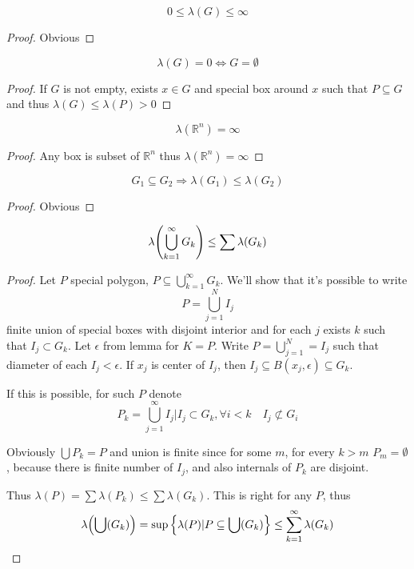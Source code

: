 \begin{prop}
	$$0 \leq \lambda(G) \leq \infty$$
	\begin{proof}
		Obvious
	\end{proof}
\end{prop}
\begin{prop}
	$$\lambda(G) = 0 \iff G =\emptyset$$
\begin{proof}
	If $G$ is not empty, exists $x\in G$ and special box around $x$ such that $P\subseteq G$and thus $\lambda(G) \leq \lambda(P) > 0$
\end{proof}
\end{prop}
\begin{prop}
	$$\lambda(\mathbb{R}^n) = \infty$$
	\begin{proof}
		Any box is subset of $\mathbb{R}^n$ thus $\lambda(\mathbb{R}^n) = \infty$
	\end{proof}
\end{prop}
\begin{prop}
	$$G_1 \subseteq G_2 \Rightarrow \lambda(G_1) \leq \lambda(G_2)$$
	\begin{proof}
		Obvious
	\end{proof}
\end{prop}
\begin{prop}
	$$\lambda\qty(\bigcup_{k=1}^\infty G_k) \leq \sum \lambda(G_k)$$
	\begin{proof}
		Let $P$ special polygon, $P\subseteq \bigcup_{k=1}^\infty G_k$. We'll show that it's possible to write 
		$$P = \bigcup_{j=1}^N I_j$$
		finite union of special boxes with disjoint interior and for each $j$ exists $k$ such that $I_j \subset G_k$. Let $\epsilon$ from lemma for $K=P$. Write $P=\bigcup_{j=1}^N = I_j$ such that diameter of each $I_j<\epsilon$. If $x_j$ is center of $I_j$, then $I_j \subseteq B(x_j,\epsilon) \subseteq G_k$.
		
		If this is possible, for such $P$ denote $$P_k =  \bigcup_{j=1}^\infty I_j | I_j \subset G_k, \forall i<k \quad I_j \not\subset G_i$$
		
		Obviously $\bigcup P_k = P$ and union is finite since for some $m$, for every $k>m$ $P_m=\emptyset$, because there is finite number of $I_j$, and also internals of $P_k$ are disjoint.
		
		Thus $\lambda(P)=\sum \lambda(P_k)\leq\sum \lambda(G_k)$.
		This is right for any $P$, thus
		$$ \lambda\qty(\bigcup (G_k)) = \sup \left\{ \lambda(P) | P\subseteq \bigcup (G_k) \right\} \leq \sum_{k=1}^\infty \lambda(G_k)$$
	\end{proof}
\end{prop}
